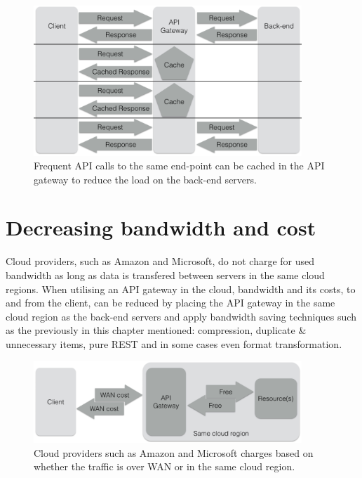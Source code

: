 \documentclass{cslthse-msc}
\begin{document}
\begin{figure}[H]
  \centering
    \begin{center}
      \includegraphics[width=0.9\textwidth]{images/api_gateway_cache.png}
    \end{center}
  \caption{Frequent API calls to the same end-point can be cached in the API gateway to reduce the load on the back-end servers.}
\end{figure}

\section{Decreasing bandwidth and cost}
Cloud providers, such as Amazon\cite{cloud_amazon} and Microsoft\cite{cloud_microsoft}, do not charge for used bandwidth as long as data is transfered between servers in the same cloud regions. When utilising an API gateway in the cloud, bandwidth and its costs, to and from the client, can be reduced by placing the API gateway in the same cloud region as the back-end servers and apply bandwidth saving techniques such as the previously in this chapter mentioned: compression, duplicate \& unnecessary items, pure REST and in some cases even format transformation.

\begin{figure}[H]
  \centering
    \begin{center}
      \includegraphics[width=0.9\textwidth]{images/api_gateway_bandwidth.png}
    \end{center}
  \caption{Cloud providers such as Amazon\cite{cloud_amazon} and Microsoft\cite{cloud_microsoft} charges based on whether the traffic is over WAN or in the same cloud region.}
\end{figure}
\end{document}
